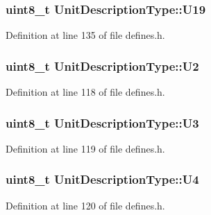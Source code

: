 \hypertarget{structUnitDescriptionType_aeb14175b8f3acc759a3a3c0148a38123}{
\subsubsection[{U19}]{\setlength{\rightskip}{0pt plus 5cm}uint8\-\_\-t Unit\-Description\-Type\-::\-U19}}\label{structUnitDescriptionType_aeb14175b8f3acc759a3a3c0148a38123}


Definition at line 135 of file defines.\-h.

\hypertarget{structUnitDescriptionType_ac6fad13d43afdf94c34b6f3a304a7005}{
\subsubsection[{U2}]{\setlength{\rightskip}{0pt plus 5cm}uint8\-\_\-t Unit\-Description\-Type\-::\-U2}}\label{structUnitDescriptionType_ac6fad13d43afdf94c34b6f3a304a7005}


Definition at line 118 of file defines.\-h.

\hypertarget{structUnitDescriptionType_ab3e64923796c7974898273319bc0356a}{
\subsubsection[{U3}]{\setlength{\rightskip}{0pt plus 5cm}uint8\-\_\-t Unit\-Description\-Type\-::\-U3}}\label{structUnitDescriptionType_ab3e64923796c7974898273319bc0356a}


Definition at line 119 of file defines.\-h.

\hypertarget{structUnitDescriptionType_af67d7027e3b93c0d1c6c9e316c31da52}{
\subsubsection[{U4}]{\setlength{\rightskip}{0pt plus 5cm}uint8\-\_\-t Unit\-Description\-Type\-::\-U4}}\label{structUnitDescriptionType_af67d7027e3b93c0d1c6c9e316c31da52}


Definition at line 120 of file defines.\-h.

